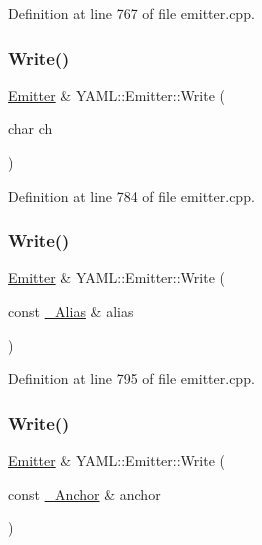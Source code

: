 Definition at line 767 of file emitter.\+cpp.

\mbox{\label{class_y_a_m_l_1_1_emitter_ab197c8f2c8bfee2ee7545af7e6843b3e}} 
\subsubsection{\texorpdfstring{Write()}{Write()}\hspace{0.1cm}{\footnotesize\ttfamily [3/9]}}
{\footnotesize\ttfamily \mbox{\hyperlink{class_y_a_m_l_1_1_emitter}{Emitter}} \& Y\+A\+M\+L\+::\+Emitter\+::\+Write (\begin{DoxyParamCaption}\item[{char}]{ch }\end{DoxyParamCaption})}



Definition at line 784 of file emitter.\+cpp.

\mbox{\label{class_y_a_m_l_1_1_emitter_a3fc3c5296d272b6d51943a76ea8ad341}} 
\subsubsection{\texorpdfstring{Write()}{Write()}\hspace{0.1cm}{\footnotesize\ttfamily [4/9]}}
{\footnotesize\ttfamily \mbox{\hyperlink{class_y_a_m_l_1_1_emitter}{Emitter}} \& Y\+A\+M\+L\+::\+Emitter\+::\+Write (\begin{DoxyParamCaption}\item[{const \mbox{\hyperlink{struct_y_a_m_l_1_1___alias}{\+\_\+\+Alias}} \&}]{alias }\end{DoxyParamCaption})}



Definition at line 795 of file emitter.\+cpp.

\mbox{\label{class_y_a_m_l_1_1_emitter_ae0fea8f4ea8bae14d7cb044154a1f80e}} 
\subsubsection{\texorpdfstring{Write()}{Write()}\hspace{0.1cm}{\footnotesize\ttfamily [5/9]}}
{\footnotesize\ttfamily \mbox{\hyperlink{class_y_a_m_l_1_1_emitter}{Emitter}} \& Y\+A\+M\+L\+::\+Emitter\+::\+Write (\begin{DoxyParamCaption}\item[{const \mbox{\hyperlink{struct_y_a_m_l_1_1___anchor}{\+\_\+\+Anchor}} \&}]{anchor }\end{DoxyParamCaption})}



